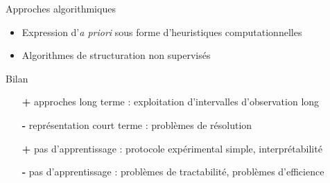 \begin{frame}{Approches \og algorithmiques \fg}
\begin{itemize}
\item Expression d'\textit{a priori} sous forme d'heuristiques computationnelles
\item Algorithmes de structuration non supervisés
\end{itemize}
\begin{block}{Bilan}
\begin{itemize}
\item[\textbf{+}] approches long terme : exploitation d'intervalles d'observation long
\item[\alert{\textbf{-}}] représentation court terme : problèmes de résolution
\item[\textbf{+}] pas d'apprentissage : protocole expérimental simple, interprétabilité
\item[\alert{\textbf{-}}] pas d'apprentissage : problèmes de tractabilité, problèmes d'efficience
\end{itemize}
\end{block}
\end{frame}
